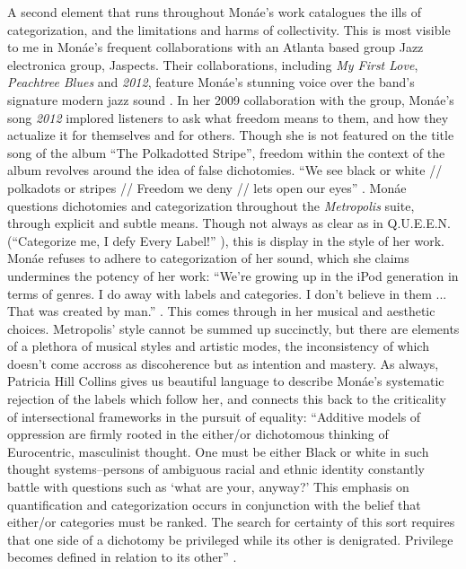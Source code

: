 \documentclass[a4paper, 11pt]{article} %
\begin{document}
A second element that runs throughout Mon\'ae's work catalogues the ills of categorization, and the limitations and harms of collectivity.
This is most visible to me in Mon\'ae's frequent collaborations with an Atlanta based group Jazz electronica group, Jaspects.
Their collaborations, including \emph{My First Love}, \emph{Peachtree Blues} and \emph{2012}, feature Mon\'ae's stunning voice over the band's signature modern jazz sound \cite{peachtreeblues} \cite{myfirstlove}.
In her 2009 collaboration with the group, Mon\'ae's song \emph{2012} implored listeners to ask what freedom means to them, and how they actualize it for themselves and for others.
Though she is not featured on the title song of the album ``The Polkadotted Stripe'', freedom within the context of the album revolves around the idea of false dichotomies.
``We see black or white // polkadots or stripes // Freedom we deny // lets open our eyes'' \cite{polkadottedstripe}.
Mon\'ae questions dichotomies and categorization throughout the \emph{Metropolis} suite, through explicit and subtle means.
Though not always as clear as in Q.U.E.E.N. (``Categorize me, I defy Every Label!'' \cite{queen}), 
this is display in the style of her work.
Mon\'ae refuses to adhere to categorization of her sound, which she claims undermines the potency of her work:
``We're growing up in the iPod generation in terms of genres. I do away with labels and categories. I don't believe in them ... That was created by man.'' \cite{joeyguerra2010}.
This comes through in her musical and aesthetic choices.
Metropolis' style cannot be summed up succinctly, but there are elements of a plethora of musical styles and artistic modes, the inconsistency of which doesn't come accross as discoherence but as intention and mastery.
As always, Patricia Hill Collins gives us beautiful language to describe Mon\'ae's systematic rejection of the labels which follow her, and connects this back to the criticality of intersectional frameworks in the pursuit of equality: ``Additive models of oppression are firmly rooted in the either/or dichotomous thinking of Eurocentric, masculinist thought. One must be either Black or white in such thought systems--persons of ambiguous racial and ethnic identity constantly battle with questions such as `what are your, anyway?' This emphasis on quantification and categorization occurs in conjunction with the belief that either/or categories must be ranked. The search for certainty of this sort requires that one side of a dichotomy be privileged while its other is denigrated. Privilege becomes defined in relation to its other'' \cite{collins2009}.
\end{document}
